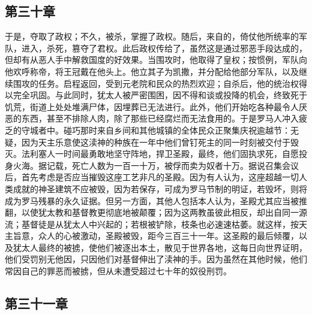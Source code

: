 
\subsection{第三十章}

于是，夺取了政权；不久，被杀，掌握了政权。随后，来自的，倚仗他所统率的军队，进入，杀死，篡夺了君权。此后政权传给了，虽然这是通过邪恶手段达成的，但却有从恶人手中解救国度的好效果。当围攻时，他取得了皇权；按惯例，军队向他欢呼称帝，将王冠戴在他头上。他立其子为凯撒，并分配给他部分军队，以及继续围攻的任务。启程返回，受到元老院和民众的热烈欢迎；自杀后，他的统治权得以完全巩固。与此同时，犹太人被严密围困，因不得和谈或投降的机会，终致死于饥荒，街道上处处堆满尸体，因埋葬已无法进行。此外，他们开始吃各种最令人厌恶的东西，甚至不排除人肉，除了那些已经腐烂而无法食用的。于是罗马人冲入疲乏的守城者中。碰巧那时来自乡间和其他城镇的全体民众正聚集庆祝逾越节：无疑，因为天主乐意使这渎神的种族在一年中他们曾钉死主的同一时刻被交付于毁灭。法利塞人一时间最勇敢地坚守阵地，捍卫圣殿，最终，他们固执求死，自愿投身火海。据记载，死亡人数为一百一十万，被俘而卖为奴者十万。据说召集会议后，首先考虑是否应当摧毁这座工艺非凡的圣殿。因为有人认为，这座超越一切人类成就的神圣建筑不应被毁，因为若保存，可成为罗马节制的明证，若毁坏，则将成为罗马残暴的永久证据。但另一方面，其他人包括本人认为，圣殿尤其应当被推翻，以使犹太教和基督教更彻底地被颠覆；因为这两教虽彼此相反，却出自同一源流；基督徒是从犹太人中兴起的；若根被铲除，枝条也必速速枯萎。就这样，按天主旨意，众人的心被激动，圣殿被毁，距今三百三十一年。这圣殿的最后倾覆，以及犹太人最终的被掳，使他们被逐出本土，散见于世界各地，这每日向世界证明，他们受罚别无他因，只因他们对基督伸出了渎神的手。因为虽然在其他时候，他们常因自己的罪恶而被掳，但从未遭受超过七十年的奴役刑罚。\par


\subsection{第三十一章}

